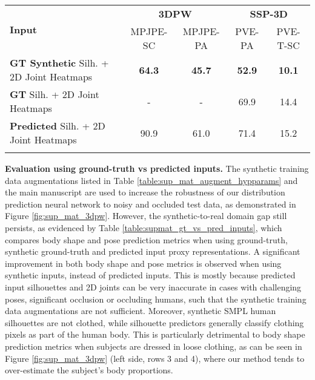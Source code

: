 \documentclass[final]{cvpr}
\begin{document}
\begin{table*}[!b]
\centering
    \begin{tabular}{l cc cc}
    \hline
    \multirow{2}{3em}{\textbf{Input}} & \multicolumn{2}{c}{\textbf{3DPW}} & \multicolumn{2}{c}{\textbf{SSP-3D}}\\
    & MPJPE-SC & MPJPE-PA & PVE-PA & PVE-T-SC\\
    \noalign{\smallskip}
    \hline
    \noalign{\smallskip}
    \textbf{GT Synthetic} Silh. + 2D Joint Heatmaps & \textbf{64.3} & \textbf{45.7} & \textbf{52.9} & \textbf{10.1}\\
    \noalign{\smallskip}
    \textbf{GT} Silh. + 2D Joint Heatmaps & - & - & 69.9 & 14.4\\
    \noalign{\smallskip}
    \textbf{Predicted} Silh. + 2D Joint Heatmaps & 90.9 & 61.0 & 71.4 & 15.2\\
    \noalign{\smallskip}
    \hline
    \end{tabular}
\caption{Comparison between ground-truth (GT), synthetic ground-truth and predicted input silhouettes and 2D joints, in terms of MPJPE-SC and MPJPE-PA (both in mm) on 3DPW \cite{vonMarcard2018}, as well as PVE-PA and PVE-T-SC (both in mm) on SSP-3D \cite{STRAPS2020BMVC}. Predicted silhouettes are obtained using DensePose \cite{Guler2018DensePose} and predicted 2D joint coordinates and confidences (for thresholding) are obtained using Keypoint-RCNN from Detectron2 \cite{wu2019detectron2}. Synthetic ground-truth inputs are obtained by rendering the SMPL \cite{SMPL:2015} body mesh labels given by SSP-3D and 3DPW, using ground-truth camera parameters, into silhouette and 2D joint input representations.}
\label{table:supmat_gt_vs_pred_inputs}
\end{table*}

\noindent \textbf{Evaluation using ground-truth vs predicted inputs.} The synthetic training data augmentations listed in Table \ref{table:sup_mat_augment_hypparams} and the main manuscript are used to increase the robustness of our distribution prediction neural network to noisy and occluded test data, as demonstrated in Figure \ref{fig:sup_mat_3dpw}. However, the synthetic-to-real domain gap still persists, as evidenced by Table \ref{table:supmat_gt_vs_pred_inputs}, which compares body shape and pose prediction metrics when using ground-truth, synthetic ground-truth and predicted input proxy representations. A significant improvement in both body shape and pose metrics is observed when using synthetic inputs, instead of predicted inputs. This is mostly because predicted input silhouettes and 2D joints can be very inaccurate in cases with challenging poses, significant occlusion or occluding humans, such that the synthetic training data augmentations are not sufficient.  Moreover, synthetic SMPL human silhouettes are not clothed, while silhouette predictors generally classify clothing pixels as part of the human body. This is particularly detrimental to body shape prediction metrics when subjects are dressed in loose clothing, as can be seen in Figure \ref{fig:sup_mat_3dpw} (left side, rows 3 and 4), where our method tends to over-estimate the subject's body proportions.
\end{document}
